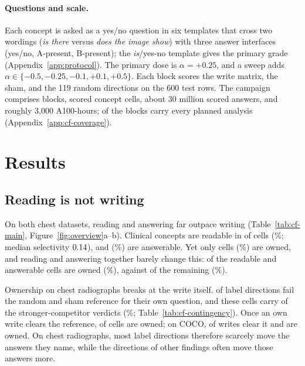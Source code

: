\documentclass{article}
\begin{document}
\paragraph{Questions and scale.}
Each concept is asked as a yes/no question in six templates that cross two wordings (\emph{is there} versus \emph{does the image show}) with three answer interfaces (yes/no, A-present, B-present); the \emph{is}/yes-no template gives the primary grade (Appendix~\ref{app:protocol}). The primary dose is $\alpha=+0.25$, and a sweep adds $\alpha\in\{-0.5,-0.25,-0.1,+0.1,+0.5\}$. Each block scores the write matrix, the sham, and the 119 random directions on the 600 test rows. The campaign comprises \cfBlocks{} blocks, \cfCells{} scored concept cells, about 30 million scored answers, and roughly 3{,}000 A100-hours; \cfCoverageBlocksAllSeven{} of the \cfBlocks{} blocks carry every planned analysis (Appendix~\ref{app:cf-coverage}).

\section{Results}
\label{sec:results}

\subsection{Reading is not writing}
\label{sec:headline}

On both chest datasets, reading and answering far outpace writing (Table~\ref{tab:cf-main}, Figure~\ref{fig:overview}a--b). Clinical concepts are readable in \cfChestReadable{} of \cfChestReadableN{} cells (\cfChestReadablePct\%; median selectivity $0.14$), and \cfChestAnswerable{} (\cfChestAnswerablePct\%) are answerable. Yet only \cfChestOwned{} cells (\cfChestOwnedPct\%) are owned, and reading and answering together barely change this: \cfReadAnsOwned{} of the \cfReadAns{} readable and answerable cells are owned (\cfReadAnsOwnedPct\%), against \cfRestOwned{} of the remaining \cfRestN{} (\cfRestOwnedPct\%).

Ownership on chest radiographs breaks at the write itself. \cfChestRefBelow{} of \cfChestCellsN{} label directions fail the random and sham reference for their own question, and these cells carry \cfChestBelowStrong{} of the \cfChestCompetitor{} stronger-competitor verdicts (\cfChestBelowStrongPct\%; Table~\ref{tab:cf-contingency}). Once an own write clears the reference, \cfChestOwned{} of \cfChestRefMet{} cells are owned; on COCO, \cfCocoRefMet{} of \cfCocoOwnedN{} writes clear it and \cfCocoOwned{} are owned. On chest radiographs, most label directions therefore scarcely move the answers they name, while the directions of other findings often move those answers more.
\end{document}
